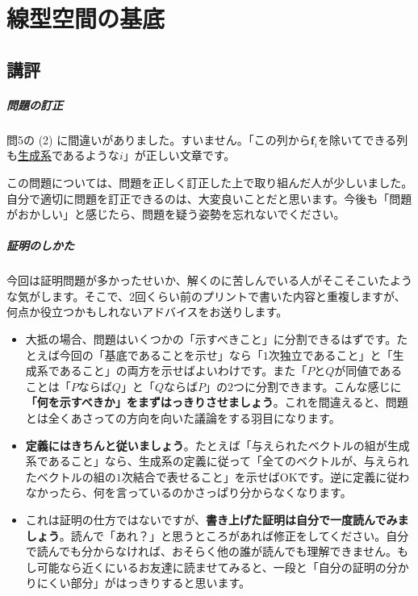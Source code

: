 \chapter{線型空間の基底}

\section{講評}

\paragraph{問題の訂正}

問5の (2) に間違いがありました。すいません。「この列から$\bm{f}_i$を除いてできる列も\uline{生成系}であるような$i$」が正しい文章です。

この問題については、問題を正しく訂正した上で取り組んだ人が少しいました。自分で適切に問題を訂正できるのは、大変良いことだと思います。今後も「問題がおかしい」と感じたら、問題を疑う姿勢を忘れないでください。

\paragraph{証明のしかた}

今回は証明問題が多かったせいか、解くのに苦しんでいる人がそこそこいたような気がします。そこで、$2$回くらい前のプリントで書いた内容と重複しますが、何点か役立つかもしれないアドバイスをお送りします。
\begin{itemize}
\item 大抵の場合、問題はいくつかの「示すべきこと」に分割できるはずです。たとえば今回の「基底であることを示せ」なら「$1$次独立であること」と「生成系であること」の両方を示せばよいわけです。また「$P$と$Q$が同値であることは「$P$ならば$Q$」と「$Q$ならば$P$」の$2$つに分割できます。こんな感じに\textbf{「何を示すべきか」をまずはっきりさせましょう}。これを間違えると、問題とは全くあさっての方向を向いた議論をする羽目になります。
\item \textbf{定義にはきちんと従いましょう}。たとえば「与えられたベクトルの組が生成系であること」なら、生成系の定義に従って「全てのベクトルが、与えられたベクトルの組の$1$次結合で表せること」を示せばOKです。逆に定義に従わなかったら、何を言っているのかさっぱり分からなくなります。
\item これは証明の仕方ではないですが、\textbf{書き上げた証明は自分で一度読んでみましょう}。読んで「あれ？」と思うところがあれば修正をしてください。自分で読んでも分からなければ、おそらく他の誰が読んでも理解できません。もし可能なら近くにいるお友達に読ませてみると、一段と「自分の証明の分かりにくい部分」がはっきりすると思います。
\end{itemize}

